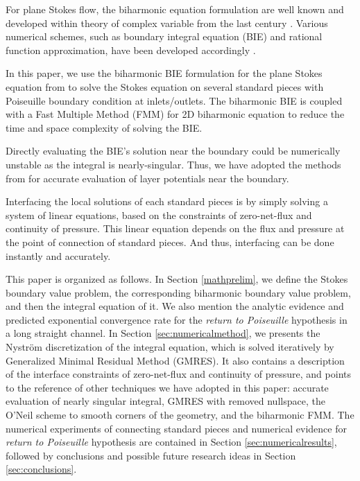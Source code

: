 \documentclass[10pt,twocolumn]{article}
\begin{document}
For plane Stokes flow, the biharmonic equation formulation are well known 
and developed within theory of complex variable from the last century \cite{ladyzhenskayaMathematicalTheoryViscous1964}. 
Various numerical schemes, such as boundary integral equation (BIE) and rational function approximation, 
have been developed accordingly \cite{greengardIntegralEquationMethods1996,trefethenApproximationTheoryApproximation2019}. 

In this paper, we use the biharmonic BIE formulation for the plane Stokes equation from 
\cite{greengardIntegralEquationMethods1996} to solve the Stokes equation on several standard pieces 
with Poiseuille boundary condition at inlets/outlets. 
The biharmonic BIE is coupled with a Fast Multiple Method (FMM) for 2D biharmonic equation
to reduce the time and space complexity of solving the BIE. \cite{FlatironinstituteFmm2d2022} 

Directly evaluating the BIE's solution near the boundary could be numerically unstable as the integral is nearly-singular.
Thus, we have adopted the methods from 
\cite{wuSolutionStokesFlow2020,helsingEvaluationLayerPotentials2008} 
for accurate evaluation of layer potentials near the boundary. 

Interfacing the local solutions of each standard pieces is by 
simply solving a system of linear equations, 
based on the constraints of zero-net-flux and continuity of pressure. 
This linear equation depends on the flux and pressure at the
point of connection of standard pieces. And thus, interfacing can be done instantly and accurately. 

This paper is organized as follows. In Section \ref{mathprelim}, we define the Stokes boundary value problem, 
the corresponding biharmonic boundary value problem, and then the integral equation of it. 
We also mention the analytic evidence and predicted exponential convergence rate for the \textit{return to Poiseuille} hypothesis in a long straight channel. 
In Section \ref{sec:numericalmethod}, we presents the Nystr\"om discretization
of the integral equation, which is solved iteratively by Generalized Minimal Residual Method (GMRES). It also contains a description of the interface constraints of zero-net-flux and continuity of pressure, and points to the reference of
other techniques we have adopted in this paper: 
accurate evaluation of nearly singular integral, 
GMRES with removed nullspace, 
the O'Neil scheme to smooth corners of the geometry,
and the biharmonic FMM. 
The numerical experiments of connecting standard pieces and numerical evidence for \textit{return to Poiseuille}
hypothesis are contained in Section \ref{sec:numericalresults}, 
followed by conclusions and possible future research ideas  in Section \ref{sec:conclusions}.
\end{document}
